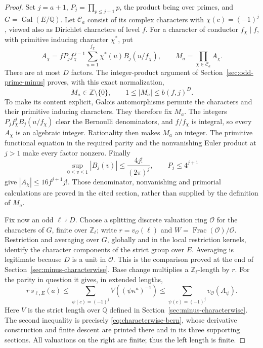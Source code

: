 \begin{proof}
Set \(j=a+1\), \(P_j=\prod_{p\leq j+1}p\), the product being over primes,
and \(G=\operatorname{Gal}(E/\mathbb Q)\).
Let \(\mathcal C_a\) consist of its complex characters with
\(\chi(c)=(-1)^j\), viewed also as Dirichlet characters of level \(f\).
For a character of conductor \(f_\chi\mid f\), with primitive inducing
character \(\chi^*\), put
\[
 A_\chi=fP_j f_\chi^{\,j-1}
       \sum_{u=1}^{f_\chi}\chi^*(u)B_j(u/f_\chi),\qquad
 M_a=\prod_{\chi\in\mathcal C_a}A_\chi .
\]
There are at most \(D\) factors. The integer-product argument of
Section~\ref{sec:odd-prime-minus} proves, with this exact normalization,
\begin{equation}\label{eq:sr-Mminus}
 M_a\in\mathbb Z\setminus\{0\},\qquad
             1\leq |M_a|\leq b(f,j)^D.
\end{equation}
To make its content explicit, Galois automorphisms permute the characters
and their primitive inducing characters. They therefore fix \(M_a\).
The integers \(P_jf_\chi^jB_j(u/f_\chi)\) clear the Bernoulli
denominators, and \(f/f_\chi\) is integral, so every \(A_\chi\) is an
algebraic integer. Rationality then makes \(M_a\) an integer.
The primitive functional equation in the required parity and the
nonvanishing Euler product at \(j>1\) make every factor nonzero.
Finally
\[
 \sup_{0\leq v\leq1}|B_j(v)|\leq\frac{4j!}{(2\pi)^j},
 \qquad P_j\leq4^{j+1}
\]
give \(|A_\chi|\leq16f^{j+1}j!\). Those denominator,
nonvanishing and primorial calculations are proved in the cited section,
rather than supplied by the definition of \(M_a\).

Fix now an odd \(\ell\nmid D\).
Choose a splitting discrete valuation ring \(\mathcal O\) for the
characters of \(G\), finite over \(\mathbb Z_\ell\);
write \(r=v_{\mathcal O}(\ell)\) and
\(W=\operatorname{Frac}(\mathcal O)/\mathcal O\).
Restriction and averaging over \(G\), globally and in the local
restriction kernels, identify the character components of the strict
group over \(E\). Averaging is legitimate because \(D\) is a unit
in \(\mathcal O\). This is the comparison proved at the end of
Section~\ref{sec:minus-characterwise}.
Base change multiplies a \(\mathbb Z_\ell\)-length by \(r\).
For the parity in question it gives, in extended lengths,
\[
 r\,s^-_{\ell,E}(a)
 \leq\sum_{\psi(c)=(-1)^j}
        V((\psi\kappa^a)^{-1})
 \leq\sum_{\psi(c)=(-1)^j}v_{\mathcal O}(A_\psi).
\]
Here \(V\) is the strict length over \(\mathbb Q\) defined in
Section~\ref{sec:minus-characterwise}.
The second inequality is precisely
\eqref{eq:characterwise-bern}, whose derivative construction and
finite descent are printed there and in its three supporting sections.
All valuations on the right are finite; thus the left length is finite.


\end{proof}
